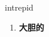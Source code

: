 
\begin{frame}
{\huge intrepid}
\begin{center}
\begin{enumerate}\Large
  \item \textbf{大胆的}
\end{enumerate}
\end{center}
\end{frame}
